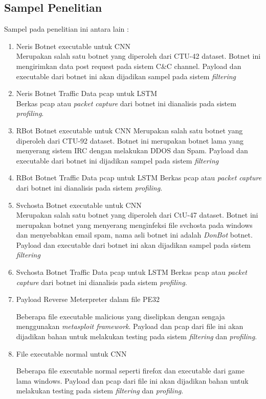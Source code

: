 \documentclass[./skripsi.tex]{subfiles}
\begin{document}
\subsection{Sampel Penelitian}
\par Sampel pada penelitian ini antara lain :
\begin{enumerate}
    \item Neris Botnet executable untuk CNN\\
    Merupakan salah satu botnet yang diperoleh dari CTU-42 dataset. Botnet ini mengirimkan data post request pada sistem C\&C channel. Payload dan executable dari botnet ini akan dijadikan sampel pada sistem \textit{filtering}
    \item Neris Botnet Traffic Data pcap untuk LSTM\\
    Berkas pcap atau \textit{packet capture} dari botnet ini dianalisis pada sistem \textit{profiling}.
    \item RBot Botnet executable untuk CNN
    Merupakan salah satu botnet yang diperoleh dari CTU-92 dataset. Botnet ini merupakan botnet lama yang menyerang sistem IRC dengan melakukan DDOS dan Spam. Payload dan executable dari botnet ini dijadikan sampel pada sistem \textit{filtering}
    \item RBot Botnet Traffic Data pcap untuk LSTM
    Berkas pcap atau \textit{packet capture} dari botnet ini dianalisis pada sistem \textit{profiling}.
    \item Svchosta Botnet executable untuk CNN\\
    Merupakan salah satu botnet yang diperoleh dari CtU-47 dataset. Botnet ini merupakan botnet yang menyerang menginfeksi file svchosta pada windows dan menyebabkan email spam, nama asli botnet ini adalah \textit{DonBot} botnet. Payload dan executable dari botnet ini akan dijadikan sampel pada sistem \textit{filtering}
    \item Svchosta Botnet Traffic Data pcap untuk LSTM
    Berkas pcap atau \textit{packet capture} dari botnet ini dianalisis pada sistem \textit{profiling}.
    \item Payload Reverse Meterpreter dalam file PE32
    \par Beberapa file executable malicious yang diselipkan dengan sengaja menggunakan \textit{metasploit framework}. Payload dan pcap dari file ini akan dijadikan bahan untuk melakukan testing pada sistem \textit{filtering} dan \textit{profiling}.
    \item File executable normal untuk CNN
    \par Beberapa file executable normal seperti firefox dan executable dari game lama windows. Payload dan pcap dari file ini akan dijadikan bahan untuk melakukan testing pada sistem \textit{filtering} dan \textit{profiling}.
\end{enumerate}
\end{document}
